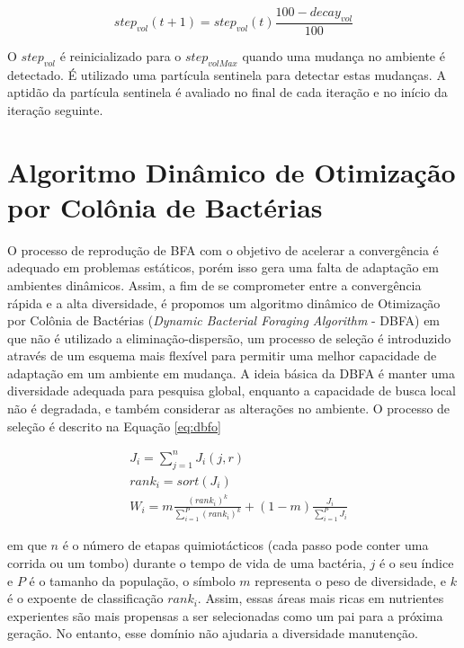 \begin{equation}
\label{eq:vpso}
step_{vol}(t+1) = step_{vol}(t) \frac{100 - decay_{vol}}{100}
\end{equation}

\noindent O $step_{vol}$ é reinicializado para o $step_{volMax}$ quando uma mudança no ambiente é detectado. É utilizado uma partícula sentinela para detectar estas mudanças. A aptidão da partícula sentinela é avaliado no final de cada iteração e no início da iteração seguinte.

\section{Algoritmo Dinâmico de Otimização por Colônia de Bactérias}
\label{sec:bfo_behaviour}

O processo de reprodução de BFA com o objetivo de acelerar a convergência é adequado em problemas estáticos, porém isso gera uma falta de adaptação em ambientes dinâmicos. Assim, a fim de se comprometer entre a convergência rápida e a alta diversidade, é propomos um algoritmo dinâmico de Otimização por Colônia de Bactérias (\textit{Dynamic Bacterial Foraging Algorithm} - DBFA) \cite{passino2002biomimicry} em que não é utilizado a eliminação-dispersão, um processo de seleção é introduzido através de um esquema mais flexível para permitir uma melhor capacidade de adaptação em um ambiente em mudança. A ideia básica da DBFA é manter uma diversidade adequada para pesquisa global, enquanto a capacidade de busca local não é degradada, e também considerar as alterações no ambiente. O processo de seleção é descrito na Equação \ref{eq:dbfo}

\begin{equation}
\label{eq:dbfo}
\begin{split}
& J_i = \sum_{j=1}^{n} J_i(j,r) \\
& rank_i = sort(J_i) \\
& W_i = m \frac{(rank_i)^k}{\sum_{i=1}^{P} (rank_i)^k} + (1 - m) \frac{J_i}{\sum_{i=1}^{P} J_i}
\end{split}
\end{equation}

\noindent em que $n$ é o número de etapas quimiotácticos (cada passo pode conter uma corrida ou um tombo) durante o tempo de vida de uma bactéria, $j$ é o seu índice e $P$ é o tamanho da população, o símbolo $m$ representa o peso de diversidade, e $k$ é o expoente de classificação $rank_i$. Assim, essas áreas mais ricas em nutrientes experientes são mais propensas a ser selecionadas como um pai para a próxima geração. No entanto, esse domínio não ajudaria a diversidade manutenção.

